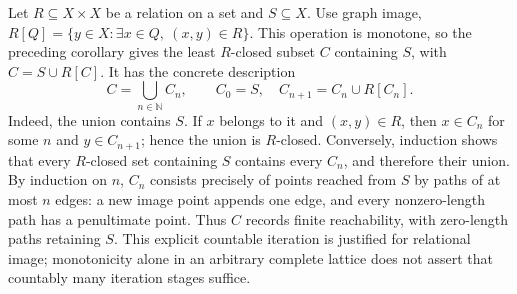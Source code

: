 \begin{example}
Let $R\subseteq X\times X$ be a relation on a set and $S\subseteq X$.
Use graph image, $R[Q]=\{y\in X:\exists x\in Q,\ (x,y)\in R\}$.
This operation is monotone, so the preceding corollary gives the least
$R$-closed subset $C$ containing $S$, with $C=S\cup R[C]$.
It has the concrete description
\[
C=\bigcup_{n\in\mathbb N}C_n,\qquad
C_0=S,\quad C_{n+1}=C_n\cup R[C_n].
\]
Indeed, the union contains $S$. If $x$ belongs to it and $(x,y)\in R$,
then $x\in C_n$ for some $n$ and $y\in C_{n+1}$; hence the union is
$R$-closed. Conversely, induction shows that every $R$-closed set
containing $S$ contains every $C_n$, and therefore their union.
By induction on $n$, $C_n$ consists precisely of points reached from
$S$ by paths of at most $n$ edges: a new image point appends one edge,
and every nonzero-length path has a penultimate point. Thus $C$
records finite reachability, with zero-length paths retaining $S$.
This explicit countable iteration is justified for relational image;
monotonicity alone in an arbitrary complete lattice does not assert
that countably many iteration stages suffice.
\end{example}

%

